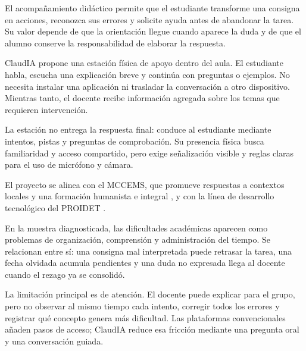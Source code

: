 \documentclass[11pt]{article}
\newcommand{\Section}[1]{\par\vspace{0.16\baselineskip}{\normalfont\normalsize\bfseries\RaggedRight #1\par}}
\begin{document}
\fontsize{11}{19}\selectfont

\Section{Introducción}

El acompañamiento didáctico permite que el estudiante transforme una consigna en acciones, reconozca sus errores y solicite ayuda antes de abandonar la tarea. Su valor depende de que la orientación llegue cuando aparece la duda y de que el alumno conserve la responsabilidad de elaborar la respuesta.

ClaudIA propone una estación física de apoyo dentro del aula. El estudiante habla, escucha una explicación breve y continúa con preguntas o ejemplos. No necesita instalar una aplicación ni trasladar la conversación a otro dispositivo. Mientras tanto, el docente recibe información agregada sobre los temas que requieren intervención.

La estación no entrega la respuesta final: conduce al estudiante mediante intentos, pistas y preguntas de comprobación. Su presencia física busca familiaridad y acceso compartido, pero exige señalización visible y reglas claras para el uso de micrófono y cámara.

El proyecto se alinea con el MCCEMS, que promueve respuestas a contextos locales y una formación humanista e integral \cite{sep2025mccms}, y con la línea de desarrollo tecnológico del PROIDET \cite{dgeti2026}.

\clearpage

\Section{Planteamiento del problema}

En la muestra diagnosticada, las dificultades académicas aparecen como problemas de organización, comprensión y administración del tiempo. Se relacionan entre sí: una consigna mal interpretada puede retrasar la tarea, una fecha olvidada acumula pendientes y una duda no expresada llega al docente cuando el rezago ya se consolidó.

La limitación principal es de atención. El docente puede explicar para el grupo, pero no observar al mismo tiempo cada intento, corregir todos los errores y registrar qué concepto genera más dificultad. Las plataformas convencionales añaden pasos de acceso; ClaudIA reduce esa fricción mediante una pregunta oral y una conversación guiada.
\end{document}

